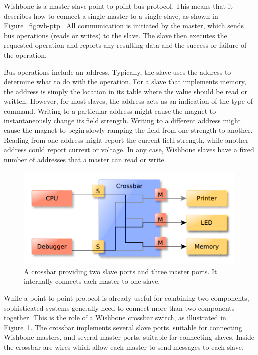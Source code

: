 \documentclass[a4paper]{jacow}
\begin{document}
Wishbone is a master-slave point-to-point bus protocol.
This means that it describes how to connect a single master to a single slave,
as shown in Figure~\ref{fig:wb-ptp}.
All communication is initiated by the master,
which sends bus operations (reads or writes) to the slave.
The slave then executes the requested operation and reports any resulting
data and the success or failure of the operation.

Bus operations include an address.
Typically, the slave uses the address to determine what to do with the operation.
For a slave that implements memory, the address is simply the location in
its table where the value should be read or written.
However, for most slaves, the address acts as an indication of the type of command.
Writing to a particular address might cause the magnet to instantaneously
change its field strength.
Writing to a different address might cause the magnet to begin slowly ramping 
the field from one strength to another.
Reading from one address might report the current field strength,
while another address could report current or voltage.
In any case,
Wishbone slaves have a fixed number of addresses that a master can read or write.

\begin{figure}[t]
  \centering
  \includegraphics*[width=\columnwidth]{crossbar}
  \caption{A crossbar providing two slave ports and three
  master ports. It internally connects each master to one slave.}
  \label{fig:crossbar}
\end{figure}

While a point-to-point protocol is already useful for combining two components,
sophisticated systems generally need to connect more than two components together.
This is the role of a Wishbone crossbar switch, as illustrated in Figure~\ref{fig:crossbar}.
The crossbar implements several slave ports, suitable for connecting
Wishbone masters, and several master ports, suitable for connecting slaves.
Inside the crossbar are wires which allow each master to send messages to each slave.
\end{document}
